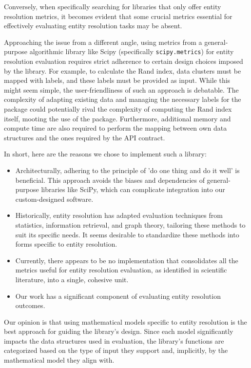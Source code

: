 \documentclass[a4paper,twoside]{article}
\begin{document}
    Conversely, when specifically searching for libraries that only offer entity
    resolution metrics, it becomes evident that some crucial metrics essential
    for effectively evaluating entity resolution tasks may be absent\cite{ereval}.

    Approaching the issue from a different angle, using metrics from a
    general-purpose algorithmic library like Scipy (specifically
    \texttt{scipy.metrics}) for entity resolution evaluation requires strict
    adherence to certain design choices imposed by the library.
    For example, to calculate the Rand index, data clusters must be mapped with
    labels, and these labels must be provided as input.
    While this might seem simple, the user-friendliness of such an approach is
    debatable.
    The complexity of adapting existing data and managing the necessary labels
    for the package could potentially rival the complexity of computing the Rand
    index itself, mooting the use of the package.
    Furthermore, additional memory and compute time are also required to perform
    the mapping between own data structures and the ones required by the API
    contract.

    In short, here are the reasons we chose to implement such a library:
    \begin{itemize}
    \item Architecturally, adhering to the principle of 'do one thing and do
    it well' is beneficial.
    This approach avoids the biases and dependencies of general-purpose
    libraries like SciPy, which can complicate integration into our
    custom-designed software.
    \item Historically, entity resolution has adapted evaluation techniques from
    statistics, information retrieval, and graph theory, tailoring these methods
    to suit its specific needs.
    It seems desirable to standardize these methods into forms specific to
    entity resolution.
    \item Currently, there appears to be no implementation that consolidates all
    the metrics useful for entity resolution evaluation, as identified in
    scientific literature, into a single, cohesive unit.
    \item Our work has a significant component of evaluating entity resolution
    outcomes.
    \end{itemize}

    Our opinion is that using mathematical models specific to entity resolution
    is the best approach for guiding the library's design.
    Since each model significantly impacts the data structures used in
    evaluation, the library's functions are categorized based on the type of
    input they support and, implicitly, by the mathematical model they align
    with.
\end{document}

